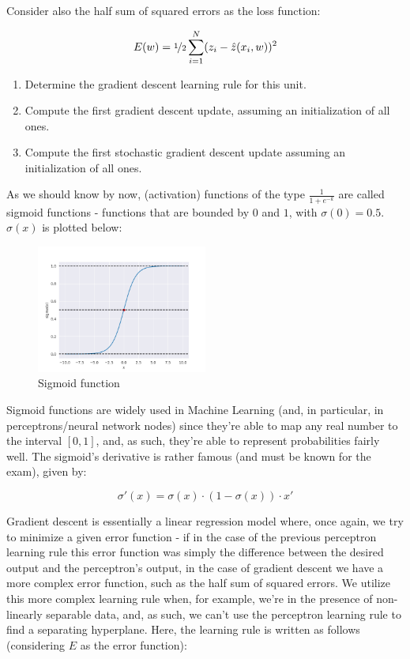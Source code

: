 \documentclass[12pt]{article}
\begin{document}
\begin{enumerate}[leftmargin=\labelsep]
\begin{tcolorbox}[enhanced jigsaw,colback=bg,boxrule=0pt,arc=1pt,halign=center]
    Consider also the half sum of squared errors as the loss function:

    \begin{equation*}
      E(w) = \nicefrac{1}{2} \sum_{i=1}^N (z_i - \hat{z}(x_i, w))^2
    \end{equation*}

    \begin{enumerate}
      \item Determine the gradient descent learning rule for this unit.
      \item Compute the first gradient descent update, assuming an initialization of all ones.
      \item Compute the first stochastic gradient descent update assuming an initialization of all ones.
    \end{enumerate}
  \end{tcolorbox}

  As we should know by now, (activation) functions of the type $\frac{1}{1 + e^{-k}}$
  are called sigmoid functions - functions that are bounded by $0$ and $1$,
  with $\sigma(0) = 0.5$. $\sigma(x)$ is plotted below:

  \begin{figure}[h]
    \centering
    \includegraphics[width=0.5\textwidth]{assets/sigmoid.png}
    \caption{Sigmoid function}
  \end{figure}

  Sigmoid functions are widely used in Machine Learning (and, in particular, in
  perceptrons/neural network nodes) since they're able to map any real number
  to the interval $[0, 1]$, and, as such, they're able to represent probabilities
  fairly well. The sigmoid's derivative is rather famous (and must be known
  for the exam), given by:

  $$
    \sigma'(x) = \sigma(x) \cdot (1 - \sigma(x)) \cdot x'
  $$

  Gradient descent is essentially a linear regression
  model where, once again, we try to minimize a given error function - if in the case
  of the previous perceptron learning rule this error function was simply the
  difference between the desired output and the perceptron's output, in the case
  of gradient descent we have a more complex error function, such as the half
  sum of squared errors. We utilize this more complex learning rule when, for example,
  we're in the presence of non-linearly separable data, and, as such, we can't
  use the perceptron learning rule to find a separating hyperplane. Here, the
  learning rule is written as follows (considering $E$ as the error function):


\end{enumerate}
\end{document}
